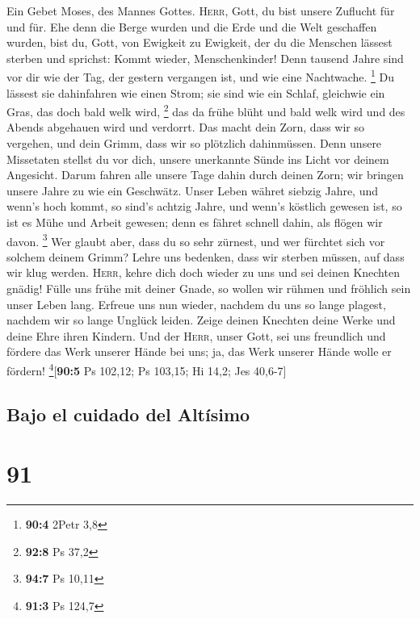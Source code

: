  Ein Gebet Moses, des Mannes Gottes. \textsc{Herr}, Gott,
du bist unsere Zuflucht für und für.  Ehe denn die Berge
wurden und die Erde und die Welt geschaffen wurden, bist du, Gott, von
Ewigkeit zu Ewigkeit,  der du die Menschen lässest sterben
und sprichst: Kommt wieder, Menschenkinder!  Denn tausend
Jahre sind vor dir wie der Tag, der gestern vergangen ist, und wie eine
Nachtwache. \footnote{\textbf{90:4} 2Petr 3,8}  Du lässest
sie dahinfahren wie einen Strom; sie sind wie ein Schlaf, gleichwie ein
Gras, das doch bald welk wird, \footnote{\textbf{92:8} Ps 37,2}
 das da frühe blüht und bald welk wird und des Abends
abgehauen wird und verdorrt.  Das macht dein Zorn, dass
wir so vergehen, und dein Grimm, dass wir so plötzlich dahinmüssen.
 Denn unsere Missetaten stellst du vor dich, unsere
unerkannte Sünde ins Licht vor deinem Angesicht.  Darum
fahren alle unsere Tage dahin durch deinen Zorn; wir bringen unsere
Jahre zu wie ein Geschwätz.  Unser Leben währet siebzig
Jahre, und wenn's hoch kommt, so sind's achtzig Jahre, und wenn's
köstlich gewesen ist, so ist es Mühe und Arbeit gewesen; denn es fähret
schnell dahin, als flögen wir davon. \footnote{\textbf{94:7} Ps 10,11}
 Wer glaubt aber, dass du so sehr zürnest, und wer
fürchtet sich vor solchem deinem Grimm?  Lehre uns
bedenken, dass wir sterben müssen, auf dass wir klug werden.
 \textsc{Herr}, kehre dich doch wieder zu uns und sei
deinen Knechten gnädig!  Fülle uns frühe mit deiner
Gnade, so wollen wir rühmen und fröhlich sein unser Leben lang.
 Erfreue uns nun wieder, nachdem du uns so lange plagest,
nachdem wir so lange Unglück leiden.  Zeige deinen
Knechten deine Werke und deine Ehre ihren Kindern.  Und
der \textsc{Herr}, unser Gott, sei uns freundlich und fördere das Werk
unserer Hände bei uns; ja, das Werk unserer Hände wolle er fördern!
\footnote{\textbf{91:3} Ps 124,7}{[}\textbf{90:5} Ps 102,12; Ps 103,15;
Hi 14,2; Jes 40,6-7{]}

\hypertarget{bajo-el-cuidado-del-altuxedsimo}{%
\subsection{Bajo el cuidado del
Altísimo}\label{bajo-el-cuidado-del-altuxedsimo}}

\hypertarget{section-90}{%
\section{91}\label{section-90}}

